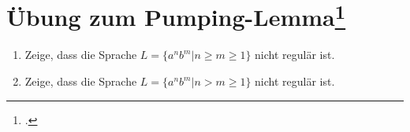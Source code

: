 \documentclass{lehramt-informatik-aufgabe}
\begin{document}
\section{Übung zum Pumping-Lemma\footcite[Seite 65]{theo:fs:1}
}

\begin{enumerate}

%

\item Zeige, dass die Sprache $L = \{a^n b^m | n \geq m \geq 1\}$ nicht
regulär ist.

%

\item Zeige, dass die Sprache $L = \{a^n b^m | n > m \geq 1\}$ nicht
regulär ist.
\end{enumerate}
\end{document}
